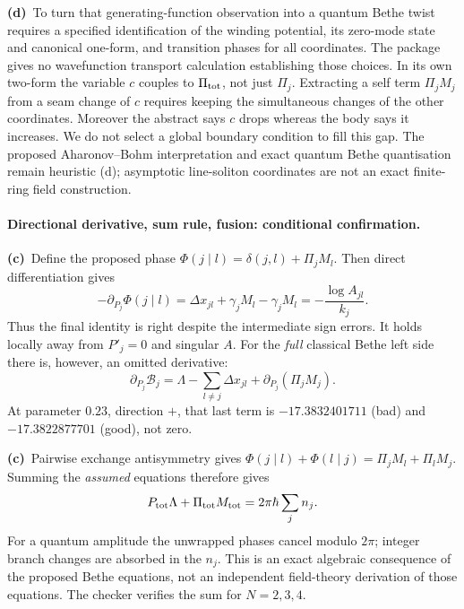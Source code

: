 \documentclass[11pt,a4paper]{article}
\newcommand{\Lc}{\textbf{(c)}\ }
\newcommand{\Ld}{\textbf{(d)}\ }
\begin{document}
\Ld To turn that generating-function observation into a quantum Bethe twist
requires a specified identification of the winding potential, its zero-mode
state and canonical one-form, and transition phases for all coordinates.
The package gives no wavefunction transport calculation establishing those
choices. In its own two-form the variable $c$ couples to $\Pi_{\rm tot}$,
not just $\Pi_j$. Extracting a self term $\Pi_jM_j$ from a seam change of $c$
requires keeping the simultaneous changes of the other coordinates.
Moreover the abstract says $c$ drops whereas the body says it increases.
We do not select a global boundary condition to fill this gap. The proposed
Aharonov--Bohm interpretation and exact quantum Bethe quantisation remain
heuristic (d); asymptotic line-soliton coordinates are not an exact finite-ring
field construction.

\paragraph{Directional derivative, sum rule, fusion: conditional confirmation.}
\Lc Define the proposed phase $\Phi(j\mid l)=\delta(j,l)+\Pi_jM_l$.
Then direct differentiation gives
\begin{equation}
 -\partial_{P_j}\Phi(j\mid l)
 =\Delta x_{jl}+\gamma_jM_l-\gamma_jM_l
 =-\frac{\log A_{jl}}{k_j}.
\end{equation}
Thus the final identity is right despite the intermediate sign errors.
It holds locally away from $P'_j=0$ and singular $A$. For the \emph{full}
classical Bethe left side there is, however, an omitted derivative:
\begin{equation}
 \partial_{P_j}\mathcal B_j
 =\Lambda-\sum_{l\ne j}\Delta x_{jl}
   +\partial_{P_j}(\Pi_jM_j).
\end{equation}
At parameter $0.23$, direction $+$, that last term is
$-17.3832401711$ (bad) and $-17.3822877701$ (good), not zero.

\Lc Pairwise exchange antisymmetry gives
$\Phi(j\mid l)+\Phi(l\mid j)=\Pi_jM_l+\Pi_lM_j$.
Summing the \emph{assumed} equations therefore gives
\begin{equation}
 P_{\rm tot}\Lambda+\Pi_{\rm tot}M_{\rm tot}
 =2\pi\hbar\sum_j n_j.
\end{equation}
For a quantum amplitude the unwrapped phases cancel modulo $2\pi$;
integer branch changes are absorbed in the $n_j$. This is an exact algebraic
consequence of the proposed Bethe equations, not an independent field-theory
derivation of those equations. The checker verifies the sum for $N=2,3,4$.
\end{document}
